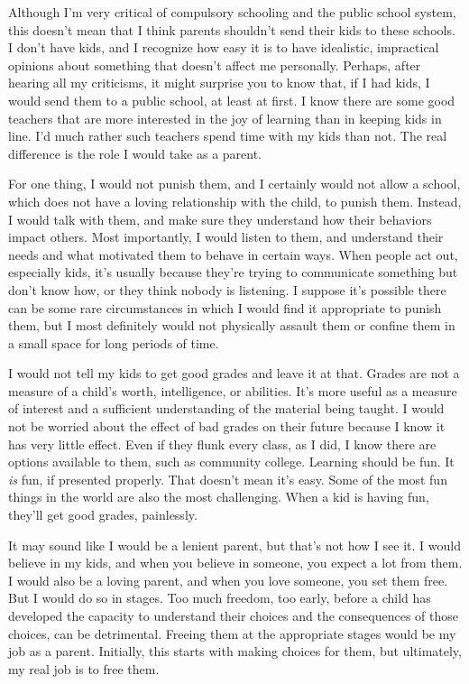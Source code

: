 Although I'm very critical of compulsory schooling and the public school system, this doesn't mean that I think parents shouldn't send their kids to these schools. I don't have kids, and I recognize how easy it is to have idealistic, impractical opinions about something that doesn't affect me personally. Perhaps, after hearing all my criticisms, it might surprise you to know that, if I had kids, I would send them to a public school, at least at first. I know there are some good teachers that are more interested in the joy of learning than in keeping kids in line. I'd much rather such teachers spend time with my kids than not. The real difference is the role I would take as a parent.

For one thing, I would not punish them, and I certainly would not allow a school, which does not have a loving relationship with the child, to punish them. Instead, I would talk with them, and make sure they understand how their behaviors impact others. Most importantly, I would listen to them, and understand their needs and what motivated them to behave in certain ways. When people act out, especially kids, it's usually because they're trying to communicate something but don't know how, or they think nobody is listening. I suppose it's possible there can be some rare circumstances in which I would find it appropriate to punish them, but I most definitely would not physically assault them or confine them in a small space for long periods of time.

I would not tell my kids to get good grades and leave it at that. Grades are not a measure of a child's worth, intelligence, or abilities. It's more useful as a measure of interest and a sufficient understanding of the material being taught. I would not be worried about the effect of bad grades on their future because I know it has very little effect. Even if they flunk every class, as I did, I know there are options available to them, such as community college. Learning should be fun. It \emph{is} fun, if presented properly. That doesn't mean it's easy. Some of the most fun things in the world are also the most challenging. When a kid is having fun, they'll get good grades, painlessly.

It may sound like I would be a lenient parent, but that's not how I see it. I would believe in my kids, and when you believe in someone, you expect a lot from them. I would also be a loving parent, and when you love someone, you set them free. But I would do so in stages. Too much freedom, too early, before a child has developed the capacity to understand their choices and the consequences of those choices, can be detrimental. Freeing them at the appropriate stages would be my job as a parent. Initially, this starts with making choices for them, but ultimately, my real job is to free them.

